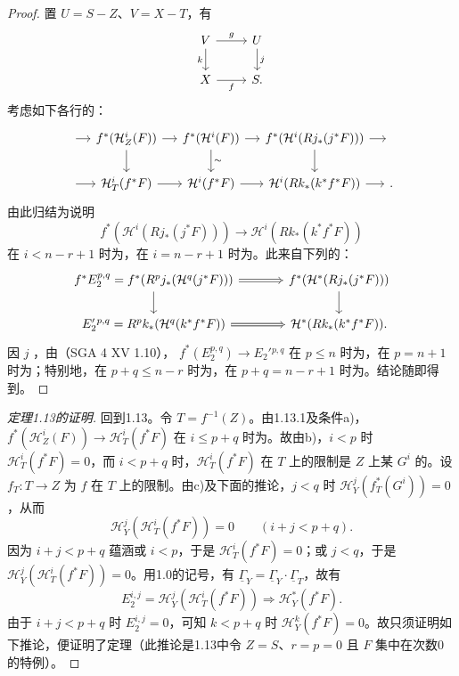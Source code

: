 \begin{proof}
置 $U=S-Z$、$V=X-T$，有
\[\begin{tikzcd}V\arrow[r,"g"]\arrow[d,"k"']&U\arrow[d,"j"]\\X\arrow[r,"f"']&S.\end{tikzcd}\]
考虑如下各行的：
\[\begin{tikzcd}[column sep=small]
{}\arrow[r]&f^*(\mathcal H_Z^i(F))\arrow[r]\arrow[d]&f^*(\mathcal H^i(F))\arrow[r]\arrow[d,"\sim"]&f^*(\mathcal H^i(Rj_*(j^*F)))\arrow[r]\arrow[d]&{}\\
{}\arrow[r]&\mathcal H_T^i(f^*F)\arrow[r]&\mathcal H^i(f^*F)\arrow[r]&\mathcal H^i(Rk_*(k^*f^*F))\arrow[r]&{}.
\end{tikzcd}\]
由此归结为说明
\[f^*(\mathcal H^i(Rj_*(j^*F)))\longrightarrow\mathcal H^i(Rk_*(k^*f^*F))\]
在 $i<n-r+1$ 时为，在 $i=n-r+1$ 时为。此来自下列的：
\[\begin{tikzcd}[column sep=large]
f^*E_2^{p,q}=f^*(R^pj_*(\mathcal H^q(j^*F)))\arrow[r,Rightarrow]\arrow[d]&f^*(\mathcal H^*(Rj_*(j^*F)))\arrow[d]\\
E_2'{}^{p,q}=R^pk_*(\mathcal H^q(k^*f^*F))\arrow[r,Rightarrow]&\mathcal H^*(Rk_*(k^*f^*F)).
\end{tikzcd}\]
因 $j$ ，由（SGA 4 XV 1.10）， $f^*(E_2^{p,q})\to E_2'{}^{p,q}$ 在 $p\leq n$ 时为，在 $p=n+1$ 时为；特别地，在 $p+q\leq n-r$ 时为，在 $p+q=n-r+1$ 时为。结论随即得到。
\end{proof}
\begin{proof}[定理1.13的证明]
回到1.13。令 $T=f^{-1}(Z)$。由1.13.1及条件a)， $f^*(\mathcal H_Z^i(F))\to\mathcal H_T^i(f^*F)$ 在 $i\leq p+q$ 时为。故由b)，$i<p$ 时 $\mathcal H_T^i(f^*F)=0$，而 $i<p+q$ 时，$\mathcal H_T^i(f^*F)$ 在 $T$ 上的限制是 $Z$ 上某 $G^i$ 的。设 $f_T:T\to Z$ 为 $f$ 在 $T$ 上的限制。由c)及下面的推论，$j<q$ 时 $\mathcal H_Y^j(f_T^*(G^i))=0$，从而
\[\mathcal H_Y^j(\mathcal H_T^i(f^*F))=0\qquad(i+j<p+q).\]
因为 $i+j<p+q$ 蕴涵或 $i<p$，于是 $\mathcal H_T^i(f^*F)=0$；或 $j<q$，于是 $\mathcal H_Y^j(\mathcal H_T^i(f^*F))=0$。用1.0的记号，有 $\underline\Gamma_Y=\underline\Gamma_Y\cdot\underline\Gamma_T$，故有
\[E_2^{i,j}=\mathcal H_Y^j(\mathcal H_T^i(f^*F))\Longrightarrow\mathcal H_Y^*(f^*F).\tag{1.13.2}\]
由于 $i+j<p+q$ 时 $E_2^{i,j}=0$，可知 $k<p+q$ 时 $\mathcal H_Y^k(f^*F)=0$。故只须证明如下推论，便证明了定理（此推论是1.13中令 $Z=S$、$r=p=0$ 且 $F$ 集中在次数0的特例）。
\end{proof}
